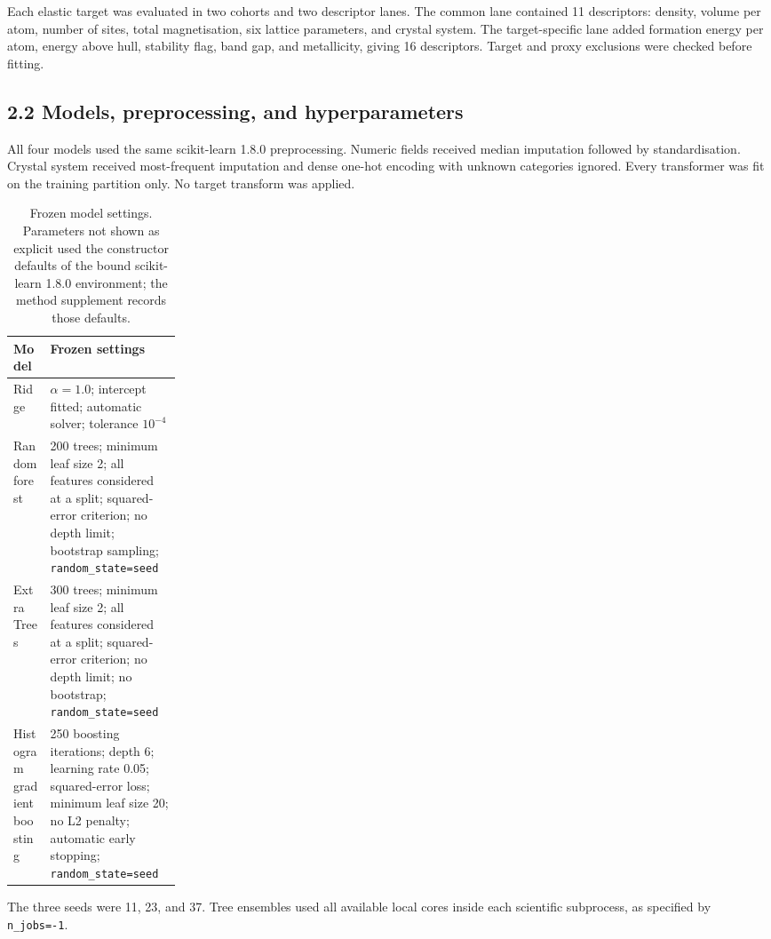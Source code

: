 \documentclass[10pt,a4paper]{article}
\begin{document}
Each elastic target was evaluated in two cohorts and two descriptor lanes. The common lane contained 11 descriptors: density, volume per atom, number of sites, total magnetisation, six lattice parameters, and crystal system. The target-specific lane added formation energy per atom, energy above hull, stability flag, band gap, and metallicity, giving 16 descriptors. Target and proxy exclusions were checked before fitting.

\subsection{2.2 Models, preprocessing, and hyperparameters}
All four models used the same scikit-learn 1.8.0 preprocessing. Numeric fields received median imputation followed by standardisation. Crystal system received most-frequent imputation and dense one-hot encoding with unknown categories ignored. Every transformer was fit on the training partition only. No target transform was applied.

\begin{table}[htbp]\centering\small
\caption{Frozen model settings. Parameters not shown as explicit used the constructor defaults of the bound scikit-learn 1.8.0 environment; the method supplement records those defaults.}
\begin{tabularx}{\linewidth}{@{}p{0.22\linewidth}X@{}}\toprule
Model & Frozen settings\\\midrule
Ridge & $\alpha=1.0$; intercept fitted; automatic solver; tolerance $10^{-4}$\\
Random forest & 200 trees; minimum leaf size 2; all features considered at a split; squared-error criterion; no depth limit; bootstrap sampling; \texttt{random\_state=seed}\\
Extra Trees & 300 trees; minimum leaf size 2; all features considered at a split; squared-error criterion; no depth limit; no bootstrap; \texttt{random\_state=seed}\\
Histogram gradient boosting & 250 boosting iterations; depth 6; learning rate 0.05; squared-error loss; minimum leaf size 20; no L2 penalty; automatic early stopping; \texttt{random\_state=seed}\\\bottomrule
\end{tabularx}\end{table}

The three seeds were 11, 23, and 37. Tree ensembles used all available local cores inside each scientific subprocess, as specified by \texttt{n\_jobs=-1}.
\end{document}
